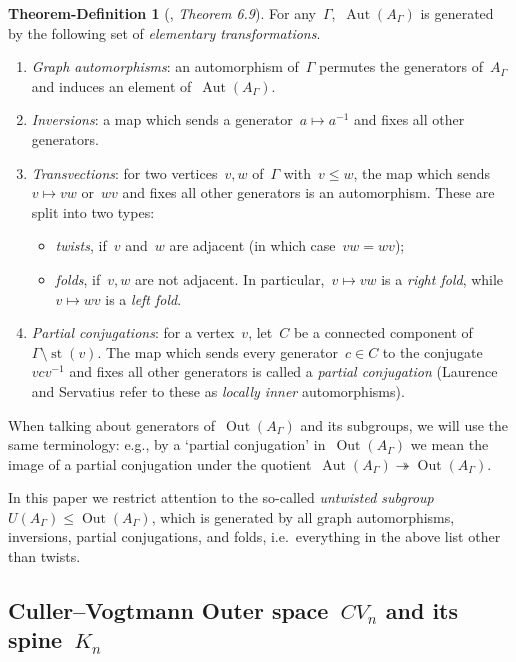 \documentclass[11pt]{amsart}
\theoremstyle{definition}
\theoremstyle{definition}
\theoremstyle{definition}
\theoremstyle{definition}
\newtheorem{theorem-definition}[theorem]{Theorem-Definition} %
\newcommand{\raag}{A_\Gamma} %
\newcommand{\uag}{U(A_{\Gamma})} %
\newcommand{\oag}{\operatorname{Out}(A_{\Gamma})} %
\newcommand{\str}[1]{\operatorname{st}({#1})} %
\begin{document}
\begin{theorem-definition}[\cite{LaurenceAutRAAGs95}, \emph{Theorem 6.9}]\label{thmdef:generators for Aut(RAAG)}
    For any~$\Gamma$,~$\operatorname{Aut}(\raag)$ is generated by the following set of \emph{elementary transformations}.
    \begin{enumerate}
        \item \emph{Graph automorphisms}: an automorphism of~$\Gamma$ permutes the generators of~$\raag$ and induces an element of~$\operatorname{Aut}(\raag)$.
        \item \emph{Inversions}: a map which sends a generator~$a \mapsto a^{-1}$ and fixes all other generators.
        \item \emph{Transvections}: for two vertices~$v, w$ of~$\Gamma$ with~$v \leq w$, the map which sends~$v \mapsto vw$ or~$wv$ and fixes all other generators is an automorphism. These are split into two types:
        \begin{itemize}
            \item \emph{twists}, if~$v$ and~$w$ are adjacent (in which case~$vw = wv$);
            \item \emph{folds}, if~$v, w$ are not adjacent. In particular,~$v \mapsto vw$ is a \emph{right fold}, while~$v \mapsto wv$ is a \emph{left fold}.
        \end{itemize}
        \item \emph{Partial conjugations}: for a vertex~$v$, let~$C$ be a connected component of~$\Gamma \setminus \str{v}$. The map which sends every generator~$c \in C$ to the conjugate~$vcv^{-1}$ and fixes all other generators is called a \emph{partial conjugation} (Laurence and Servatius refer to these as \emph{locally inner} automorphisms).  
    \end{enumerate}
\end{theorem-definition}

When talking about generators of~$\oag$ and its subgroups, we will use the same terminology: e.g., by a `partial conjugation' in~$\oag$ we mean the image of a partial conjugation under the quotient~$\operatorname{Aut}(\raag) \twoheadrightarrow \oag$.

In this paper we restrict attention to the so-called \emph{untwisted subgroup}~$\uag \leq \oag$, which is generated by all graph automorphisms, inversions, partial conjugations, and folds, i.e.~everything in the above list other than twists. 

\subsection{Culler--Vogtmann Outer space~$CV_n$ and its spine~$K_n$}\label{subsec:Culler-Vogtmann Outer space}
\end{document}
